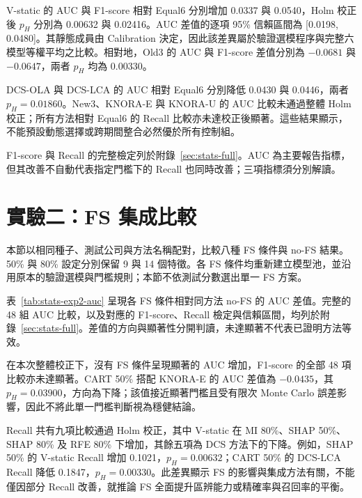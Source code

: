

V-static 的 AUC 與 F1-score 相對 Equal6 分別增加 0.0337 與 0.0540，Holm 校正後 \(p_H\) 分別為 0.00632 與 0.02416。AUC 差值的逐項 95\% 信賴區間為 [0.0198, 0.0480]。其靜態成員由 Calibration 決定，因此該差異屬於驗證選模程序與完整六模型等權平均之比較。相對地，Old3 的 AUC 與 F1-score 差值分別為 \(-0.0681\) 與 \(-0.0647\)，兩者 \(p_H\) 均為 0.00330。

DCS-OLA 與 DCS-LCA 的 AUC 相對 Equal6 分別降低 0.0430 與 0.0446，兩者 \(p_H=0.01860\)。New3、KNORA-E 與 KNORA-U 的 AUC 比較未通過整體 Holm 校正；所有方法相對 Equal6 的 Recall 比較亦未達校正後顯著。這些結果顯示，不能預設動態選擇或跨期間整合必然優於所有控制組。

F1-score 與 Recall 的完整檢定列於附錄~\ref{sec:stats-full}。AUC 為主要報告指標，但其改善不自動代表指定門檻下的 Recall 也同時改善；三項指標須分別解讀。

\section{實驗二：FS 集成比較}\label{sec:results-experiment2}

本節以相同種子、測試公司與方法名稱配對，比較八種 FS 條件與 no-FS 結果。50\% 與 80\% 設定分別保留 9 與 14 個特徵。各 FS 條件均重新建立模型池，並沿用原本的驗證選模與門檻規則；本節不依測試分數選出單一 FS 方案。



表~\ref{tab:stats-exp2-auc} 呈現各 FS 條件相對同方法 no-FS 的 AUC 差值。完整的 48 組 AUC 比較，以及對應的 F1-score、Recall 檢定與信賴區間，均列於附錄~\ref{sec:stats-full}。差值的方向與顯著性分開判讀，未達顯著不代表已證明方法等效。

在本次整體校正下，沒有 FS 條件呈現顯著的 AUC 增加，F1-score 的全部 48 項比較亦未達顯著。CART 50\% 搭配 KNORA-E 的 AUC 差值為 \(-0.0435\)，其 \(p_H=0.03900\)，方向為下降；該值接近顯著門檻且受有限次 Monte Carlo 誤差影響，因此不將此單一門檻判斷視為穩健結論。

Recall 共有九項比較通過 Holm 校正，其中 V-static 在 MI 80\%、SHAP 50\%、SHAP 80\% 及 RFE 80\% 下增加，其餘五項為 DCS 方法下的下降。例如，SHAP 50\% 的 V-static Recall 增加 0.1021，\(p_H=0.00632\)；CART 50\% 的 DCS-LCA Recall 降低 0.1847，\(p_H=0.00330\)。此差異顯示 FS 的影響與集成方法有關，不能僅因部分 Recall 改善，就推論 FS 全面提升區辨能力或精確率與召回率的平衡。

